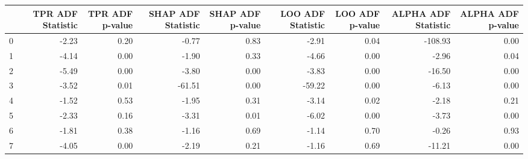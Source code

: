 \begin{tabular}{lrrrrrrrr}
\toprule
 & TPR ADF Statistic & TPR ADF p-value & SHAP ADF Statistic & SHAP ADF p-value & LOO ADF Statistic & LOO ADF p-value & ALPHA ADF Statistic & ALPHA ADF p-value \\
\midrule
0 & -2.23 & 0.20 & -0.77 & 0.83 & -2.91 & 0.04 & -108.93 & 0.00 \\
1 & -4.14 & 0.00 & -1.90 & 0.33 & -4.66 & 0.00 & -2.96 & 0.04 \\
2 & -5.49 & 0.00 & -3.80 & 0.00 & -3.83 & 0.00 & -16.50 & 0.00 \\
3 & -3.52 & 0.01 & -61.51 & 0.00 & -59.22 & 0.00 & -6.13 & 0.00 \\
4 & -1.52 & 0.53 & -1.95 & 0.31 & -3.14 & 0.02 & -2.18 & 0.21 \\
5 & -2.33 & 0.16 & -3.31 & 0.01 & -6.02 & 0.00 & -3.73 & 0.00 \\
6 & -1.81 & 0.38 & -1.16 & 0.69 & -1.14 & 0.70 & -0.26 & 0.93 \\
7 & -4.05 & 0.00 & -2.19 & 0.21 & -1.16 & 0.69 & -11.21 & 0.00 \\
\bottomrule
\end{tabular}
